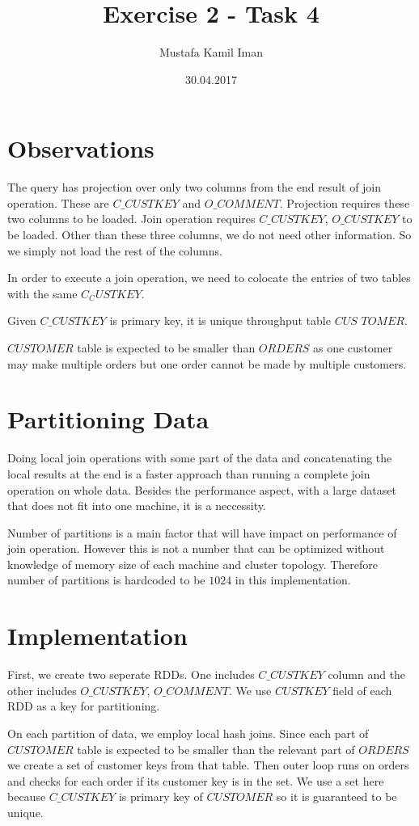 \documentclass{article}
\title{Exercise 2 - Task 4}
\author{Mustafa Kamil Iman}
\begin{document}
\date{30.04.2017}
\maketitle

\section{Observations}
The query has projection over only two columns from the end result of join operation. These are $C\_CUSTKEY$ and $O\_COMMENT$. Projection requires these two columns to be loaded. Join operation requires $C\_CUSTKEY$, $O\_CUSTKEY$ to be loaded. Other than these three columns, we do not need other information. So we simply not load the rest of the columns.

In order to execute a join operation, we need to colocate the entries of two tables with the same $C_CUSTKEY$.

Given $C\_CUSTKEY$ is primary key, it is unique throughput table $CUS$ $TOMER$.

$CUSTOMER$ table is expected to be smaller than $ORDERS$ as one customer may make multiple orders but one order cannot be made by multiple customers.

\section{Partitioning Data}
Doing local join operations with some part of the data and concatenating the local results at the end is a faster approach than running a complete join operation on whole data. Besides the performance aspect, with a large dataset that does not fit into one machine, it is a neccessity.

Number of partitions is a main factor that will have impact on performance of join operation. However this is not a number that can be optimized without knowledge of memory size of each machine and cluster topology. Therefore number of partitions is hardcoded to be $1024$ in this implementation.

\section{Implementation}
First, we create two seperate RDDs. One includes $C\_CUSTKEY$ column and the other includes $O\_CUSTKEY$, $O\_COMMENT$. We use $CUSTKEY$ field of each RDD as a key for partitioning.

On each partition of data, we employ local hash joins. Since each part of $CUSTOMER$ table is expected to be smaller than the relevant part of $ORDERS$ we create a set of customer keys from that table. Then outer loop runs on orders and checks for each order if its customer key is in the set. We use a set here because $C\_CUSTKEY$ is primary key of $CUSTOMER$ so it is guaranteed to be unique. 
\end{document}

